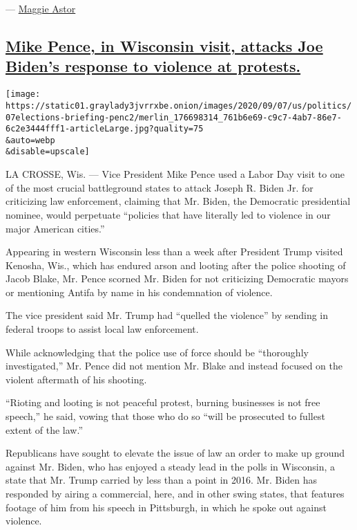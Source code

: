 --- \href{https://www.nytimes3xbfgragh.onion/by/maggie-astor}{Maggie
Astor}

\hypertarget{mike-pence-in-wisconsin-visit-attacks-joe-bidens-response-to-violence-at-protests}{%
\subsection{\texorpdfstring{\protect\hyperlink{mike-pence-in-wisconsin-visit-attacks-joe-bidens-response-to-violence-at-protests}{Mike
Pence, in Wisconsin visit, attacks Joe Biden's response to violence at
protests.}}{Mike Pence, in Wisconsin visit, attacks Joe Biden's response to violence at protests.}}\label{mike-pence-in-wisconsin-visit-attacks-joe-bidens-response-to-violence-at-protests}}

\texttt{[image: https://static01.graylady3jvrrxbe.onion/images/2020/09/07/us/politics/07elections-briefing-penc2/merlin\_176698314\_761b6e69-c9c7-4ab7-86e7-6c2e3444fff1-articleLarge.jpg?quality=75\\\&auto=webp\\\&disable=upscale]}

LA CROSSE, Wis. --- Vice President Mike Pence used a Labor Day visit to
one of the most crucial battleground states to attack Joseph R. Biden
Jr. for criticizing law enforcement, claiming that Mr. Biden, the
Democratic presidential nominee, would perpetuate ``policies that have
literally led to violence in our major American cities.''

Appearing in western Wisconsin less than a week after President Trump
visited Kenosha, Wis., which has endured arson and looting after the
police shooting of Jacob Blake, Mr. Pence scorned Mr. Biden for not
criticizing Democratic mayors or mentioning Antifa by name in his
condemnation of violence.

The vice president said Mr. Trump had ``quelled the violence'' by
sending in federal troops to assist local law enforcement.

While acknowledging that the police use of force should be ``thoroughly
investigated,'' Mr. Pence did not mention Mr. Blake and instead focused
on the violent aftermath of his shooting.

``Rioting and looting is not peaceful protest, burning businesses is not
free speech,'' he said, vowing that those who do so ``will be prosecuted
to fullest extent of the law.''

Republicans have sought to elevate the issue of law an order to make up
ground against Mr. Biden, who has enjoyed a steady lead in the polls in
Wisconsin, a state that Mr. Trump carried by less than a point in 2016.
Mr. Biden has responded by airing a commercial, here, and in other swing
states, that features footage of him from his speech in Pittsburgh, in
which he spoke out against violence.

